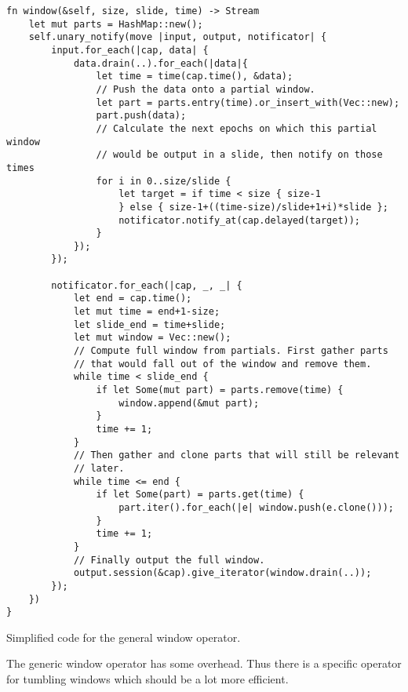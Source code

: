 \begin{listing}[H]
\begin{verbatim}
fn window(&self, size, slide, time) -> Stream
    let mut parts = HashMap::new();
    self.unary_notify(move |input, output, notificator| {
        input.for_each(|cap, data| {
            data.drain(..).for_each(|data|{
                let time = time(cap.time(), &data);
                // Push the data onto a partial window.
                let part = parts.entry(time).or_insert_with(Vec::new);
                part.push(data);
                // Calculate the next epochs on which this partial window
                // would be output in a slide, then notify on those times
                for i in 0..size/slide {
                    let target = if time < size { size-1
                    } else { size-1+((time-size)/slide+1+i)*slide };
                    notificator.notify_at(cap.delayed(target));
                }
            });
        });
        
        notificator.for_each(|cap, _, _| {
            let end = cap.time();
            let mut time = end+1-size;
            let slide_end = time+slide;
            let mut window = Vec::new();
            // Compute full window from partials. First gather parts
            // that would fall out of the window and remove them.
            while time < slide_end {
                if let Some(mut part) = parts.remove(time) {
                    window.append(&mut part);
                }
                time += 1;
            }
            // Then gather and clone parts that will still be relevant
            // later.
            while time <= end {
                if let Some(part) = parts.get(time) {
                    part.iter().for_each(|e| window.push(e.clone()));
                }
                time += 1;
            }
            // Finally output the full window.
            output.session(&cap).give_iterator(window.drain(..));
        });
    })
}
\end{verbatim}
  \caption{Simplified code for the general window operator.}
  \label{lst:epoch-window}
\end{listing}

The generic window operator has some overhead. Thus there is a specific operator for tumbling windows which should be a lot more efficient.

